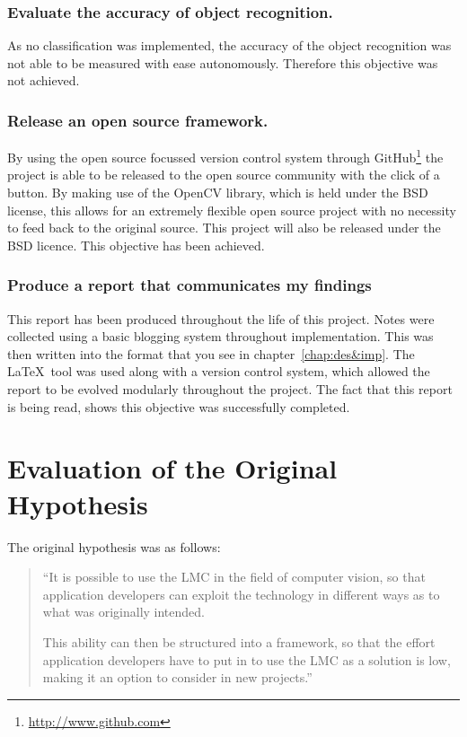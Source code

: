 \documentclass[11pt,oneside]{report}
\begin{document}
		\subsubsection{Evaluate the accuracy of object recognition.}
		As no classification was implemented, the accuracy of the object recognition was not able to be measured with ease autonomously.
		Therefore this objective was not achieved.
		\subsubsection{Release an open source framework.}
		By using the open source focussed version control system through GitHub\footnote{\url{http://www.github.com}} the project is able to be released to the open source community with the click of a button.
		By making use of the OpenCV library, which is held under the BSD license, this allows for an extremely flexible open source project with no necessity to feed back to the original source.
		This project will also be released under the BSD licence.
		This objective has been achieved.
		\subsubsection{Produce a report that communicates my findings}
		This report has been produced throughout the life of this project.
		Notes were collected using a basic blogging system throughout implementation.
		This was then written into the format that you see in chapter~\ref{chap:des&imp}.
		The \LaTeX\ tool was used along with a version control system, which allowed the report to be evolved modularly throughout the project.
		The fact that this report is being read, shows this objective was successfully completed.
	
	\section{Evaluation of the Original Hypothesis}
	The original hypothesis was as follows:
	\begin{quote}
	``It is possible to use the LMC in the field of computer vision, so that application developers can exploit the technology in different ways as to what was originally intended.	
				
	This ability can then be structured into a framework, so that the effort application developers have to put in to use the LMC as a solution is low, making it an option to consider in new projects.''
	\end{quote}
	
\end{document}
